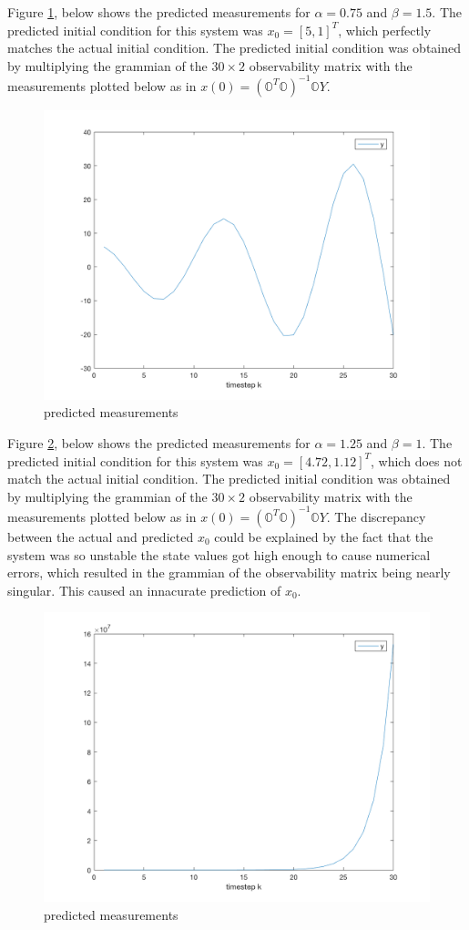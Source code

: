 \documentclass[11pt]{article}
\begin{document}
Figure \ref{fig:2d_plot2}, below shows the predicted measurements for $\alpha=0.75$ and $\beta=1.5$. The predicted initial condition for this system was $x_0=[5,1]^T$, which perfectly matches the actual initial condition. The predicted initial condition was obtained by multiplying the grammian of the $30\times2$ observability matrix with the measurements plotted below as in $x(0)=(\mathbb{O}^T\mathbb{O})^{-1}\mathbb{O}Y$. 

\begin{figure}[h!]
	\centering
	\includegraphics[width=0.6\linewidth]{2d_plot2.png}
	\caption{predicted measurements}
	\label{fig:2d_plot2}
\end{figure}

Figure \ref{fig:2d_plot3}, below shows the predicted measurements for $\alpha=1.25$ and $\beta=1$. The predicted initial condition for this system was $x_0=[4.72,1.12]^T$, which does not match the actual initial condition. The predicted initial condition was obtained by multiplying the grammian of the $30\times2$ observability matrix with the measurements plotted below as in $x(0)=(\mathbb{O}^T\mathbb{O})^{-1}\mathbb{O}Y$. The discrepancy between the actual and predicted $x_0$ could be explained by the fact that the system was so unstable the state values got high enough to cause numerical errors, which resulted in the grammian of the observability matrix being nearly singular. This caused an innacurate prediction of $x_0$. 

\begin{figure}[h!]
	\centering
	\includegraphics[width=0.6\linewidth]{2d_plot3.png}
	\caption{predicted measurements}
	\label{fig:2d_plot3}
\end{figure}
\end{document}
